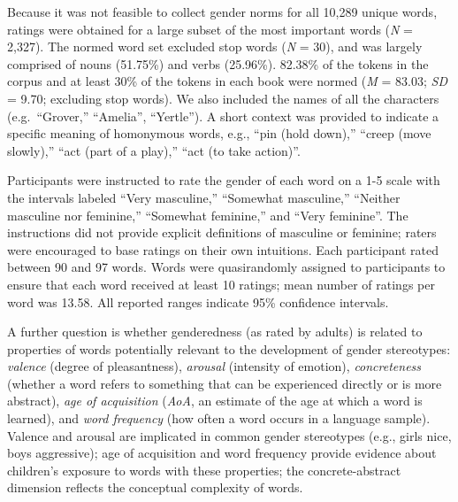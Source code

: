 \documentclass[english,,man,floatsintext]{apa6}
\begin{document}
Because it was not feasible to collect gender norms for all 10,289 unique words, ratings were obtained for a large subset of the most important words (\emph{N} = 2,327). The normed word set excluded stop words (\emph{N} = 30), and was largely comprised of nouns (51.75\%) and verbs (25.96\%). 82.38\% of the tokens in the corpus and at least 30\% of the tokens in each book were normed (\emph{M} = 83.03; \emph{SD} = 9.70; excluding stop words). We also included the names of all the characters (e.g.~\enquote{Grover,} \enquote{Amelia}, \enquote{Yertle}). A short context was provided to indicate a specific meaning of homonymous words, e.g., \enquote{pin (hold down),} \enquote{creep (move slowly),} \enquote{act (part of a play),} \enquote{act (to take action)}.

Participants were instructed to rate the gender of each word on a 1-5 scale with the intervals labeled \enquote{Very masculine,} \enquote{Somewhat masculine,} \enquote{Neither masculine nor feminine,} \enquote{Somewhat feminine,} and \enquote{Very feminine}. The instructions did not provide explicit definitions of masculine or feminine; raters were encouraged to base ratings on their own intuitions. Each participant rated between 90 and 97 words. Words were quasirandomly assigned to participants to ensure that each word received at least 10 ratings; mean number of ratings per word was 13.58. All reported ranges indicate 95\% confidence intervals.

A further question is whether genderedness (as rated by adults) is related to properties of words potentially relevant to the development of gender stereotypes: \emph{valence} (degree of pleasantness), \emph{arousal} (intensity of emotion), \emph{concreteness} (whether a word refers to something that can be experienced directly or is more abstract), \emph{age of acquisition} (\emph{AoA}, an estimate of the age at which a word is learned), and \emph{word frequency} (how often a word occurs in a language sample). Valence and arousal are implicated in common gender stereotypes (e.g., girls nice, boys aggressive); age of acquisition and word frequency provide evidence about children's exposure to words with these properties; the concrete-abstract dimension reflects the conceptual complexity of words.
\end{document}
